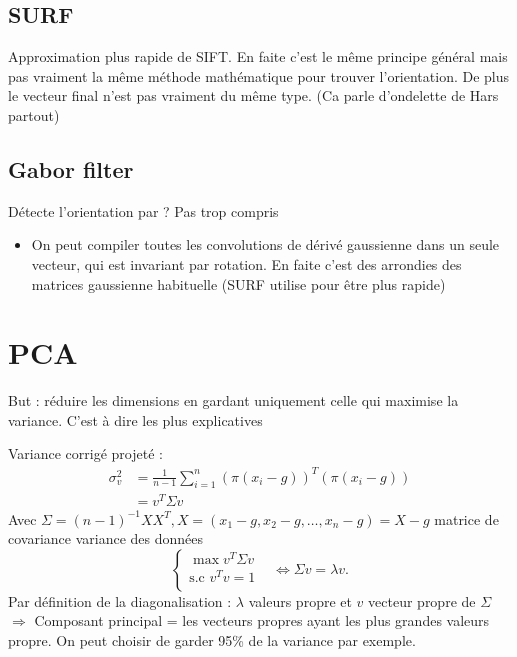 \documentclass{article}
\theoremstyle{plain}%
\theoremstyle{definition}
\theoremstyle{remark}
\begin{document}
\subsection{SURF}
Approximation plus rapide de SIFT. En faite c'est le même principe général mais pas vraiment la même méthode mathématique pour trouver l'orientation. De plus le vecteur final n'est pas vraiment du même type. (Ca parle d'ondelette de Hars partout)

\subsection{Gabor filter}
Détecte l'orientation par ? Pas trop compris
\begin{itemize}
    \item On peut compiler toutes les convolutions de dérivé gaussienne dans un seule vecteur, qui est invariant par rotation. En faite c'est des arrondies des matrices gaussienne habituelle (SURF utilise pour être plus rapide)
\end{itemize}

\section{PCA}
But : réduire les dimensions en gardant uniquement celle qui maximise la variance. C'est à dire les plus explicatives 

Variance corrigé projeté : \begin{align*}
    \sigma _v^2 &= \frac{1}{n-1}\sum_{i=1}^{n}(\pi (x_i - g))^T (\pi (x_i - g)) \\
    &= v^T \Sigma v
\end{align*}
Avec $ \Sigma = (n-1)^{-1} X X^T, X = (x_1 - g, x_2 - g, \dots, x_n - g) = X - g$ matrice de covariance variance des données
\[
    \begin{cases}
    \max v^T \Sigma v &\text{}\\
    \text{s.c } v^T v = 1\\
    \end{cases} \Leftrightarrow \Sigma v = \lambda v
.\]
Par définition de la diagonalisation : $ \lambda $ valeurs propre et $ v $ vecteur propre de $ \Sigma  $ \\
$\Rightarrow $ Composant principal = les vecteurs propres ayant les plus grandes valeurs propre. On peut choisir de garder 95\% de la variance par exemple.
\end{document}
